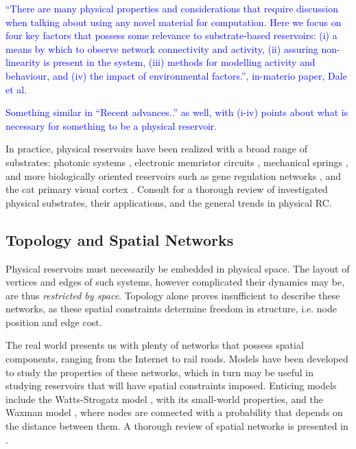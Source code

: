 \textcolor{blue}{
  ``There are many physical properties and considerations that require
discussion when talking about using any novel material for computation. Here we
focus on four key factors that possess some relevance to substrate-based
reservoirs: (i) a means by which to observe network connectivity and activity,
(ii) assuring non-linearity is present in the system, (iii) methods for
modelling activity and behaviour, and (iv) the impact of environmental
factors.'', in-materio paper, Dale et al.
}

\textcolor{blue}{
  Something similar in ``Recent advances..'' as well, with (i-iv) points about
what is necessary for something to be a physical reservoir.
}

In practice, physical reservoirs have been realized with a broad range of
substrates: photonic systems \cite{vandoorne_experimental_2014}, electronic
memristor circuits \cite{kulkarni_memristor-based_2012}, mechanical springs
\cite{hauser_towards_2011}, and more biologically oriented reservoirs such as
gene regulation networks \cite{jones_is_2007}, and the cat primary visual cortex
\cite{scholkopf_temporal_2007}. Consult \cite{tanaka_recent_2018} for a thorough
review of investigated physical substrates, their applications, and the general
trends in physical RC.

\subsection{Topology and Spatial Networks}

Physical reservoirs must necessarily be embedded in physical space. The layout
of vertices and edges of such systems, however complicated their dynamics may
be, are thus \textit{restricted by space}. Topology alone proves insufficient to
describe these networks, as these spatial constraints determine freedom in
structure, i.e. node position and edge cost.

The real world presents us with plenty of networks that possess spatial
components, ranging from the Internet to rail roads. Models have been developed
to study the properties of these networks, which in turn may be useful in
studying reservoirs that will have spatial constraints imposed. Enticing models
include the Watts-Strogatz model \cite{watts_collective_1998}, with its
small-world properties, and the Waxman model \cite{waxman_routing_1988}, where
nodes are connected with a probability that depends on the distance between
them. A thorough review of spatial networks is presented in
\cite{barthelemy_spatial_2011}.

